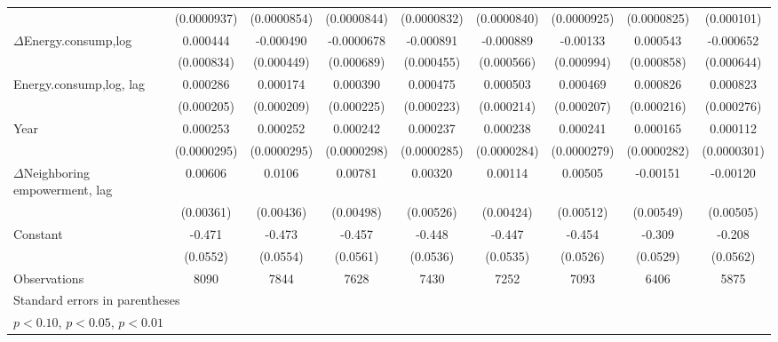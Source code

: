 \begin{table}[htbp]
\begin{tabular}{l*{8}{c}}
                    & (0.0000937)         & (0.0000854)         & (0.0000844)         & (0.0000832)         & (0.0000840)         & (0.0000925)         & (0.0000825)         &  (0.000101)         \\
[1em]
$\Delta$Energy.consump,log            &    0.000444         &   -0.000490         &  -0.0000678         &   -0.000891\sym{*}  &   -0.000889         &    -0.00133         &    0.000543         &   -0.000652         \\
                    &  (0.000834)         &  (0.000449)         &  (0.000689)         &  (0.000455)         &  (0.000566)         &  (0.000994)         &  (0.000858)         &  (0.000644)         \\
[1em]
Energy.consump,log, lag            &    0.000286         &    0.000174         &    0.000390\sym{*}  &    0.000475\sym{**} &    0.000503\sym{**} &    0.000469\sym{**} &    0.000826\sym{***}&    0.000823\sym{***}\\
                    &  (0.000205)         &  (0.000209)         &  (0.000225)         &  (0.000223)         &  (0.000214)         &  (0.000207)         &  (0.000216)         &  (0.000276)         \\
[1em]
Year                &    0.000253\sym{***}&    0.000252\sym{***}&    0.000242\sym{***}&    0.000237\sym{***}&    0.000238\sym{***}&    0.000241\sym{***}&    0.000165\sym{***}&    0.000112\sym{***}\\
                    & (0.0000295)         & (0.0000295)         & (0.0000298)         & (0.0000285)         & (0.0000284)         & (0.0000279)         & (0.0000282)         & (0.0000301)         \\
[1em]
$\Delta$Neighboring empowerment, lag&     0.00606\sym{*}  &      0.0106\sym{**} &     0.00781         &     0.00320         &     0.00114         &     0.00505         &    -0.00151         &    -0.00120         \\
                    &   (0.00361)         &   (0.00436)         &   (0.00498)         &   (0.00526)         &   (0.00424)         &   (0.00512)         &   (0.00549)         &   (0.00505)         \\
[1em]
Constant            &      -0.471\sym{***}&      -0.473\sym{***}&      -0.457\sym{***}&      -0.448\sym{***}&      -0.447\sym{***}&      -0.454\sym{***}&      -0.309\sym{***}&      -0.208\sym{***}\\
                    &    (0.0552)         &    (0.0554)         &    (0.0561)         &    (0.0536)         &    (0.0535)         &    (0.0526)         &    (0.0529)         &    (0.0562)         \\
\hline
Observations        &        8090         &        7844         &        7628         &        7430         &        7252         &        7093         &        6406         &        5875         \\
\hline\hline
\multicolumn{9}{l}{\footnotesize Standard errors in parentheses}\\
\multicolumn{9}{l}{\footnotesize \sym{*} \(p<0.10\), \sym{**} \(p<0.05\), \sym{***} \(p<0.01\)}\\
\end{tabular}
\end{table}

